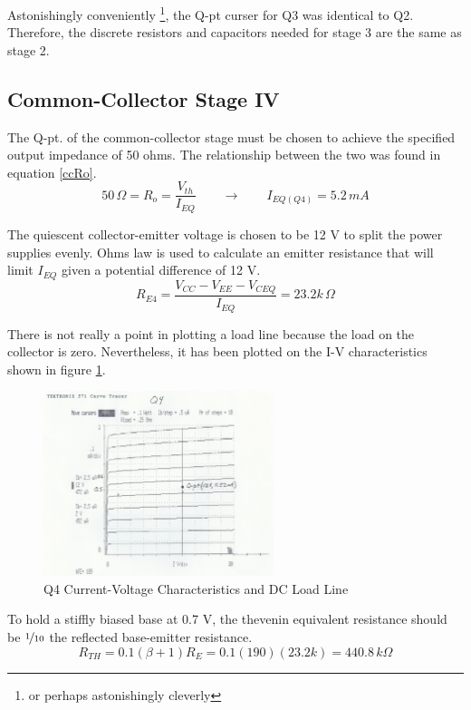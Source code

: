 \documentclass[titlepage, letterpaper, 10.5pt]{article}
\begin{document}
Astonishingly conveniently
\footnote{or perhaps astonishingly cleverly},
the Q-pt curser for Q3 was identical to Q2. Therefore, the discrete
resistors and capacitors needed for stage 3 are the same as stage 2.

\subsection{Common-Collector Stage IV}

The Q-pt. of the common-collector stage must be chosen to achieve the
specified output impedance of 50 ohms. The relationship between the
two was found in equation \ref{ccRo}.
\begin{equation*}
50\,\Omega=R_{o}=\frac{V_{th}}{I_{EQ}}
\qquad\rightarrow\qquad I_{EQ(Q4)}=5.2\,mA
\end{equation*}

The quiescent collector-emitter voltage is chosen to be 12 V to split
the power supplies evenly. Ohms law is used to calculate an emitter
resistance that will limit $I_{EQ}$ given a potential difference of
12 V.
\begin{equation*}
R_{E4}=\frac{V_{CC}-V_{EE}-V_{CEQ}}{I_{EQ}}=23.2k\,\Omega
\end{equation*}

There is not really a point in plotting a load line because the load
on the collector is zero. Nevertheless, it has been plotted on the
I-V characteristics shown in figure \ref{q4Characteristics}.

\begin{figure}[ht]
	\centering
	\includegraphics[width=0.6\textwidth]
		{measurements/q4Characteristics}
	\caption{
		Q4 Current-Voltage Characteristics and DC Load Line
	}
	\label{q4Characteristics}
\end{figure}

To hold a stiffly biased base at 0.7 V, the thevenin equivalent
resistance should be $\nicefrac{1}{10}$ the reflected base-emitter
resistance.
\begin{equation*}
R_{TH}=0.1(\beta+1)R_{E}=0.1(190)(23.2k)=440.8\,k\Omega
\end{equation*}
\end{document}
